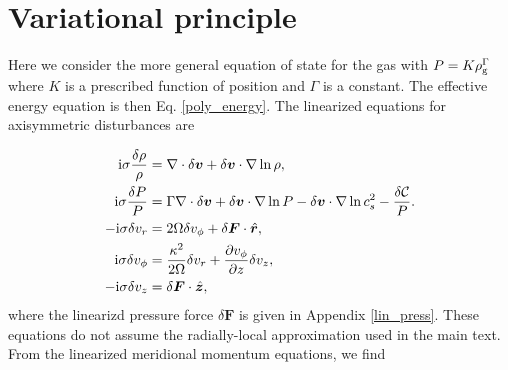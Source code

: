 \section{Variational principle}\label{var_prin}

Here we consider the more general equation of state for the gas with
$P = K \rho_\mathrm{g}^{\Gamma}$ where $K$ is a prescribed function of position
and $\Gamma$ is a constant. The effective energy equation is then
Eq. \ref{poly_energy}. The linearized equations for axisymmetric
disturbances are  

\begin{align}
  \mathrm{i}\sigma\frac{\delta\rho}{\rho} &= \nabla\cdot\delta\bm{v} +
  \delta\bm{v}\cdot\nabla\ln{\rho},\label{lin_mass_full}\\
   \mathrm{i}\sigma\frac{\delta P}{P} &= \Gamma \nabla\cdot\delta\bm{v} +
  \delta\bm{v}\cdot\nabla\ln{P} - \delta\bm{v}\cdot\nabla\ln{c_s^2} - \frac{\delta\mathcal{C}}{P}.\label{lin_energy_full}\\
  -\mathrm{i}\sigma\delta v_r  &= 2\Omega\delta v_\phi + 
  \delta\bm{F}\cdot\hat{\bm{r}},\\
  \mathrm{i}\sigma\delta v_\phi &= \frac{\kappa^2}{2\Omega}\delta v_r + \frac{\partial
    v_\phi}{\partial z}\delta v_z,\\
  -\mathrm{i}\sigma\delta v_z &=  \delta\bm{F}\cdot\hat{\bm{z}}, 
\end{align}  
where the linearizd pressure force $\delta \bm{F}$ is given in
Appendix \ref{lin_press}. These equations do not assume the
radially-local approximation used in the main text. From the
linearized meridional momentum equations, we find  

